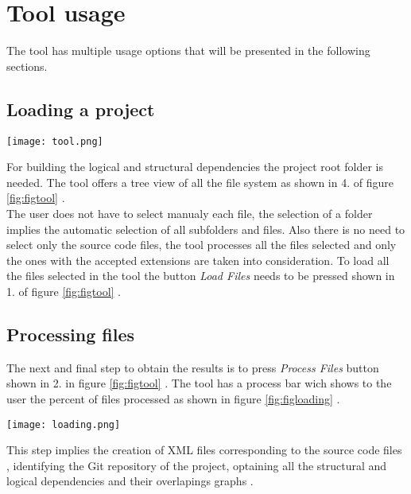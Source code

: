 \chapter{Tool usage}
The tool has multiple usage options that will be presented in the following sections. 
\section{Loading a project}
\begin{figure*}[h]
\centering
\texttt{[image: tool.png]}
\caption{User interface}
\label{fig:figtool}
\end{figure*}

\tab For building the logical and structural dependencies the project root folder is needed. The tool offers a tree view of all the file system as shown in 4. of figure \ref{fig:figtool} . \\ The user does not have to select manualy each file, the selection of a folder implies the automatic selection of all subfolders and files. Also there is no need to select only the source code files, the tool processes all the files selected and only the ones with the accepted extensions are taken into consideration. To load all the files selected in the tool the button \textit{Load Files} needs to be pressed shown in 1. of figure \ref{fig:figtool} .

\section{Processing files}
\tab The next and final step to obtain the results is to press \textit{Process Files} button shown in 2. in figure \ref{fig:figtool} . The tool has a process bar wich shows to the user the percent of files processed as shown in figure \ref{fig:figloading} .

\begin{figure*}[h]
\centering
\texttt{[image: loading.png]}
\caption{Loading files process bar}
\label{fig:figloading}
\end{figure*}

 This step implies the creation of XML files corresponding to the source code files , identifying the Git repository of the project, optaining all the structural and logical dependencies and their overlapings graphs .

